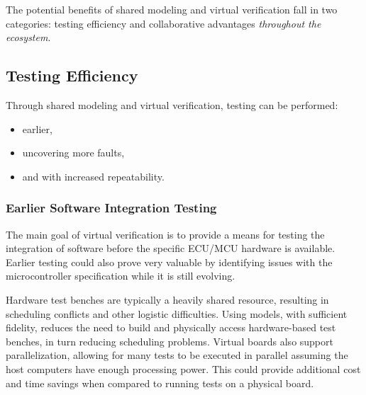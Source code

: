 The potential benefits of shared modeling and virtual verification fall in two categories:
testing efficiency and collaborative advantages \emph{throughout the ecosystem}.

\subsection{Testing Efficiency}
Through shared modeling and virtual verification, testing can be performed:

\begin{itemize}
    \item earlier,
    \item uncovering more faults,
    \item and with increased repeatability.
\end{itemize}

\subsubsection*{Earlier Software Integration Testing}
The main goal of virtual verification is to provide a means for testing the integration of software before the specific ECU/MCU hardware is available.
Earlier testing could also prove very valuable by identifying issues with the microcontroller specification while it is still evolving.

Hardware test benches are typically a heavily shared resource, resulting in scheduling conflicts and other logistic difficulties.
Using models, with sufficient fidelity,
reduces the need to build and physically access hardware-based test benches,
in turn reducing scheduling problems.
Virtual boards also support parallelization, allowing for many tests to be executed in parallel assuming the host computers have enough processing power.
This could provide additional cost and time savings when compared to running tests on a physical board.

